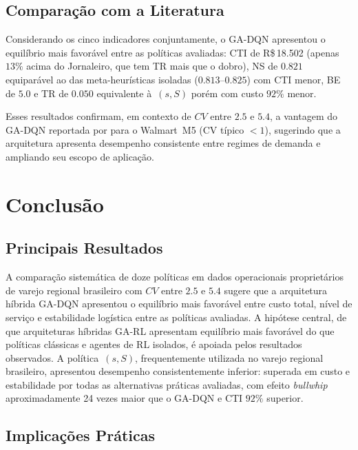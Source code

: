 \documentclass[a4paper,11pt]{article}
\begin{document}
\subsection{Comparação com a Literatura}

Considerando os cinco indicadores conjuntamente, o GA-DQN
apresentou o equilíbrio mais favorável entre as políticas avaliadas:
CTI de R\$\,18.502 (apenas
$13\%$ acima do Jornaleiro, que tem TR mais que o dobro), NS de
$0.821$ equiparável ao das meta-heurísticas isoladas
($0.813$--$0.825$) com CTI menor, BE de $5.0$
e TR de $0.050$ equivalente à~$(s,S)$ porém com custo $92\%$ menor.

Esses resultados confirmam, em contexto de $CV$ entre $2.5$ e $5.4$,
a vantagem do GA-DQN reportada por \citet{zabraoui:2025} para o
Walmart~M5 (CV típico $< 1$), sugerindo que a arquitetura apresenta desempenho consistente
entre regimes de demanda e ampliando seu escopo de aplicação.

\section{Conclusão}

\subsection{Principais Resultados}

A comparação sistemática de doze políticas em dados operacionais
proprietários de varejo regional brasileiro com $CV$ entre $2.5$
e $5.4$ sugere que a arquitetura híbrida GA-DQN apresentou o
equilíbrio mais favorável entre custo total, nível de serviço e
estabilidade logística entre as políticas avaliadas. A hipótese
central, de que arquiteturas híbridas GA-RL apresentam equilíbrio
mais favorável do que políticas clássicas e agentes de RL isolados,
é apoiada pelos resultados observados. A política~$(s,S)$,
frequentemente utilizada no varejo regional brasileiro, apresentou
desempenho consistentemente inferior: superada em custo e
estabilidade por todas as alternativas práticas avaliadas, com
efeito \textit{bullwhip} aproximadamente 24 vezes maior que o
GA-DQN e CTI $92\%$ superior.

\subsection{Implicações Práticas}
\end{document}
